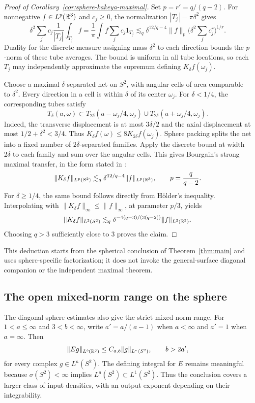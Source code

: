 \begin{proof}[Proof of Corollary~\ref{cor:sphere-kakeya-maximal}]
Set $p=r'=q/(q-2)$. For nonnegative $f\in L^p(\mathbb R^3)$ and $c_j\ge0$,
the normalization $|T_j|=\pi\delta^2$ gives
\[
 \delta^2\sum_j c_j\frac1{|T_j|}\int_{T_j}f
 =\frac1\pi\int f\sum_jc_j1_{T_j}
 \lesssim_q\delta^{12/q-4}\|f\|_p
                \Big(\delta^2\sum_jc_j^r\Big)^{1/r}.
\]
Duality for the discrete measure assigning mass $\delta^2$ to each
direction bounds the $p$-norm of these tube averages. The bound is
uniform in all tube locations, so each $T_j$ may independently
approximate the supremum defining $K_\delta f(\omega_j)$.

Choose a maximal $\delta$-separated net on $S^2$, with angular cells
of area comparable to $\delta^2$. Every direction in a cell is within
$\delta$ of its center $\omega_j$. For $\delta<1/4$, the corresponding
tubes satisfy
\[
 T_\delta(a,\omega)\subset
 T_{2\delta}(a-\omega_j/4,\omega_j)
 \cup T_{2\delta}(a+\omega_j/4,\omega_j).
\]
Indeed, the transverse displacement is at most $3\delta/2$ and the
axial displacement at most $1/2+\delta^2<3/4$. Thus
$K_\delta f(\omega)\le8K_{2\delta}f(\omega_j)$.
Sphere packing splits the net into a fixed number of
$2\delta$-separated families. Apply the discrete bound at width
$2\delta$ to each family and sum over the angular cells. This gives
Bourgain's strong maximal transfer, in the form stated in
\cite[Theorem~3.3, pp.~10--11]{MattilaFourierNotes}:
\[
 \|K_\delta f\|_{L^p(S^2)}
 \lesssim_q\delta^{12/q-4}\|f\|_{L^p(\mathbb R^3)},
 \qquad p=\frac{q}{q-2}.
\]
For $\delta\ge1/4$, the same bound follows directly from H\"older's
inequality. Interpolating with
\(\|K_\delta f\|_\infty\le\|f\|_\infty\), at parameter \(p/3\), yields
\[
 \|K_\delta f\|_{L^3(S^2)}
 \lesssim_q\delta^{-4(q-3)/(3(q-2))}\|f\|_{L^3(\mathbb R^3)}.
\]
Choosing \(q>3\) sufficiently close to \(3\) proves the claim.
\end{proof}

This deduction starts from the spherical conclusion of
Theorem~\ref{thm:main} and uses sphere-specific factorization; it does
not invoke the general-surface diagonal companion or the independent
maximal theorem.


\subsection{The open mixed-norm range on the sphere}

The diagonal sphere estimates also give the strict mixed-norm range.
For $1<a\le\infty$ and $3<b<\infty$, write $a'=a/(a-1)$ when
$a<\infty$ and $a'=1$ when $a=\infty$. Then
\begin{equation}\label{eq:sphere-mixed-norm}
 \|Eg\|_{L^b(\mathbb R^3)}\le C_{a,b}\|g\|_{L^a(S^2)},
 \qquad b>2a',
\end{equation}
for every complex $g\in L^a(S^2)$. The defining integral for $E$
remains meaningful because $\sigma(S^2)<\infty$ implies
$L^a(S^2)\subset L^1(S^2)$. Thus the conclusion covers a larger
class of input densities, with an output exponent depending on
their integrability.

